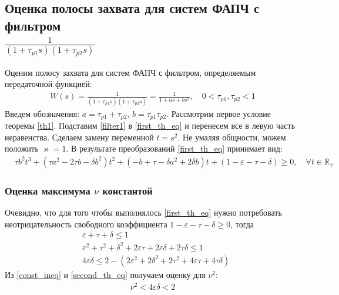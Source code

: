\documentclass[a4paper,14pt]{article} %
\theoremstyle{cited}
\begin{document}
\subsection{Оценка полосы захвата для систем ФАПЧ с фильтром \\ $\frac{1}{(1+\tau_{p1}s)(1+\tau_{p2}s)}$}
Оценим полосу захвата для систем ФАПЧ с фильтром, определяемым передаточной функцией:
 \begin{equation}\label{filter1}
 \begin{aligned}
W(s) = \frac{1}{(1+\tau_{p1}s)(1+\tau_{p2}s)} = \frac{1}{1+as + bs^2}, \quad 0<\tau_{p1},\tau_{p2} < 1
 \end{aligned}
\end{equation}
Введем обозначения: $a = \tau_{p1}+\tau_{p2}$, $b = \tau_{p1}\tau_{p2}$. Рассмотрим первое условие теоремы \ref{th1}. Подставим \eqref{filter1} в \eqref{first_th_eq} и перенесем все в левую часть неравенства. Сделаем замену переменной $t = s^2$. Не умаляя общности, можем положить $\varkappa = 1$. В результате преобразований \eqref{first_th_eq} принимает вид:
\begin{equation}\label{first_condition}
 \begin{aligned}
&\tau b^2t^3 + (\tau a^2-2 \tau b - \delta b^2)t^2 + (- b+\tau-\delta a^2 + 2\delta b)t + (1-\varepsilon-\tau-\delta) \geqslant 0, \quad \forall t \in \mathbb{R_+}
 \end{aligned}
\end{equation}

\subsubsection{Оценка максимума $\nu$ константой}
Очевидно, что для того чтобы выполнялось \eqref{first_th_eq} нужно потребовать неотрицательность свободного коэффициента $1 - \varepsilon - \tau - \delta \geqslant 0$, тогда
\begin{equation}\label{const_ineq}
 \begin{aligned}
&\varepsilon+\tau+\delta \leqslant 1 \\
&\varepsilon^2 + \tau^2 + \delta^2 + 2\varepsilon\tau + 2\varepsilon\delta + 2\tau\delta \leqslant 1\\
&4\varepsilon\delta \leqslant 2 -(2\varepsilon^2 + 2\delta^2 + 2\tau^2 +4\varepsilon\tau + 4\tau\delta)
 \end{aligned}
\end{equation}
Из \eqref{const_ineq} и \eqref{second_th_eq} получаем оценку для $\nu^2$:
\begin{equation}
 \begin{aligned}
\nu^2 < 4\varepsilon\delta < 2
 \end{aligned}
\end{equation}
\end{document}
